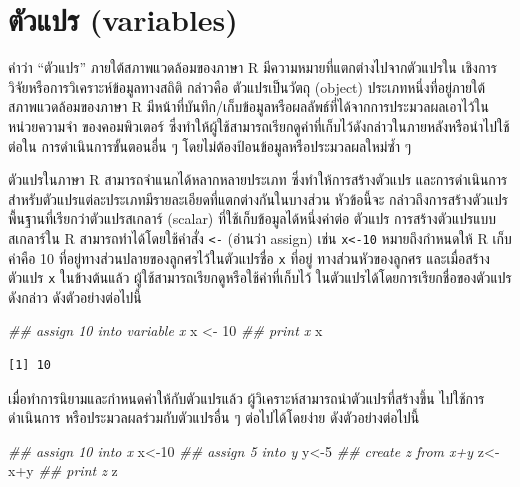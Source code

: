 \documentclass[
  a4paper,
]{book}
\newenvironment{Shaded}{\begin{snugshade}}{\end{snugshade}}
\newcommand{\DecValTok}[1]{\textcolor[rgb]{0.68,0.00,0.00}{#1}}
\newcommand{\DocumentationTok}[1]{\textcolor[rgb]{0.37,0.37,0.37}{\textit{#1}}}
\newcommand{\NormalTok}[1]{\textcolor[rgb]{0.00,0.23,0.31}{#1}}
\newcommand{\OtherTok}[1]{\textcolor[rgb]{0.00,0.23,0.31}{#1}}
\newcommand{\SpecialCharTok}[1]{\textcolor[rgb]{0.37,0.37,0.37}{#1}}
\begin{document}
\section{ตัวแปร (variables)}\label{uxe15uxe27uxe41uxe1buxe23-variables}

คำว่า ``ตัวแปร'' ภายใต้สภาพแวดล้อมของภาษา R มีความหมายที่แตกต่างไปจากตัวแปรใน
เชิงการวิจัยหรือการวิเคราะห์ข้อมูลทางสถิติ กล่าวคือ ตัวแปรเป็นวัตถุ (object)
ประเภทหนึ่งที่อยู่ภายใต้สภาพแวดล้อมของภาษา R
มีหน้าที่บันทึก/เก็บข้อมูลหรือผลลัพธ์ที่ได้จากการประมวลผลเอาไว้ในหน่วยความจำ ของคอมพิวเตอร์
ซึ่งทำให้ผู้ใช้สามารถเรียกดูค่าที่เก็บไว้ดังกล่าวในภายหลังหรือนำไปใช้ต่อใน
การดำเนินการขั้นตอนอื่น ๆ โดยไม่ต้องป้อนข้อมูลหรือประมวลผลใหม่ซ้ำ ๆ

ตัวแปรในภาษา R สามารถจำแนกได้หลากหลายประเภท ซึ่งทำให้การสร้างตัวแปร
และการดำเนินการสำหรับตัวแปรแต่ละประเภทมีรายละเอียดที่แตกต่างกันในบางส่วน หัวข้อนี้จะ
กล่าวถึงการสร้างตัวแปรพื้นฐานที่เรียกว่าตัวแปรสเกลาร์ (scalar) ที่ใช้เก็บข้อมูลได้หนึ่งค่าต่อ
ตัวแปร การสร้างตัวแปรแบบสเกลาร์ใน R สามารถทำได้โดยใช้คำสั่ง
\texttt{\textless{}-} (อ่านว่า assign) เช่น \texttt{x\textless{}-10}
หมายถึงกำหนดให้ R เก็บค่าคือ 10 ที่อยู่ทางส่วนปลายของลูกศรไว้ในตัวแปรชื่อ \texttt{x}
ที่อยู่ ทางส่วนหัวของลูกศร และเมื่อสร้างตัวแปร \texttt{x} ในข้างต้นแล้ว
ผู้ใช้สามารถเรียกดูหรือใช้ค่าที่เก็บไว้ ในตัวแปรได้โดยการเรียกชื่อของตัวแปรดังกล่าว
ดังตัวอย่างต่อไปนี้

\begin{Shaded}
\begin{Highlighting}[]
\DocumentationTok{\#\# assign 10 into variable \textquotesingle{}x\textquotesingle{}}
\NormalTok{x }\OtherTok{\textless{}{-}} \DecValTok{10}
\DocumentationTok{\#\# print x}
\NormalTok{x}
\end{Highlighting}
\end{Shaded}

\begin{verbatim}
[1] 10
\end{verbatim}

เมื่อทำการนิยามและกำหนดค่าให้กับตัวแปรแล้ว ผู้วิเคราะห์สามารถนำตัวแปรที่สร้างขึ้น
ไปใช้การดำเนินการ หรือประมวลผลร่วมกับตัวแปรอื่น ๆ ต่อไปได้โดยง่าย ดังตัวอย่างต่อไปนี้

\begin{Shaded}
\begin{Highlighting}[]
\DocumentationTok{\#\# assign 10 into x}
\NormalTok{x}\OtherTok{\textless{}{-}}\DecValTok{10}
\DocumentationTok{\#\# assign 5 into y}
\NormalTok{y}\OtherTok{\textless{}{-}}\DecValTok{5}
\DocumentationTok{\#\# create z from x+y}
\NormalTok{z}\OtherTok{\textless{}{-}}\NormalTok{x}\SpecialCharTok{+}\NormalTok{y}
\DocumentationTok{\#\# print z}
\NormalTok{z}
\end{Highlighting}
\end{Shaded}
\end{document}
